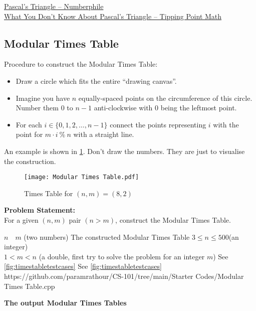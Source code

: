 \begin{funvideo}
\href{https://youtu.be/0iMtlus-afo}{Pascal's Triangle -- Numberphile}\\
\href{https://youtu.be/J0I1NuxUcpQ}{What You Don't Know About Pascal's Triangle -- Tipping Point Math}
\end{funvideo}
\recalctypearea
\subsection{Modular Times Table}{\label{pp:timestable}}
Procedure to construct the Modular Times Table:
\begin{itemize}
	\item Draw a circle which fits the entire ``drawing canvas''.
	\item Imagine you have $n$ equally-spaced points on the circumference of this circle. Number them $0$ to $n-1$ anti-clockwise with $0$ being the leftmost point.
	\item For each $i \in \{0,1,2,\ldots,n-1\}$ connect the points representing $i$ with the point for $m\cdot i\ \%\ n$ with a straight line.
\end{itemize} An example is shown in \ref{fig:timestable}. Don't draw the numbers. They are just to visualise the construction.
\begin{figure}[H]
	\centering
	\texttt{[image: Modular Times Table.pdf]}
	\caption{Times Table for $(n,m)=(8,2)$}
	\label{fig:timestable}
\end{figure}
\textbf{Problem Statement:}\\
For a given $(n,m)$ pair $(n>m)$, construct the Modular Times Table.
\begin{testcases}
	{$n\quad m$ \hfill(two numbers)}
	{The constructed Modular Times Table}
	{$3 \leq n \leq 500$\hfill(an integer)\\
	$1 < m < n$ \hfill(a double, first try to solve the problem for an integer $m$)}
	{See \ref{fig:timestabletestcases}}
	{See \ref{fig:timestabletestcases}}
	{https://github.com/paramrathour/CS-101/tree/main/Starter Codes/Modular Times Table.cpp}
\end{testcases}
\textbf{The output Modular Times Tables}
